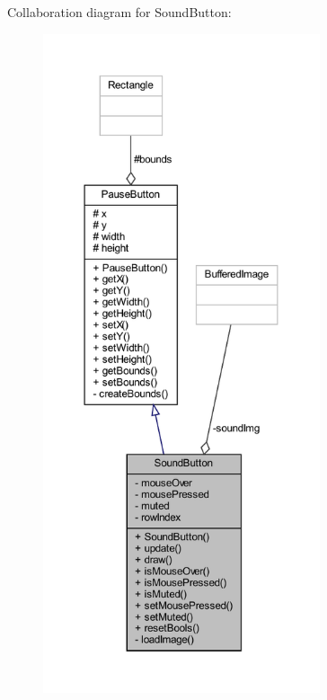 Collaboration diagram for Sound\+Button\+:\nopagebreak
\begin{figure}[H]
\begin{center}
\leavevmode
\includegraphics[height=550pt]{classui_1_1_sound_button__coll__graph}
\end{center}
\end{figure}
